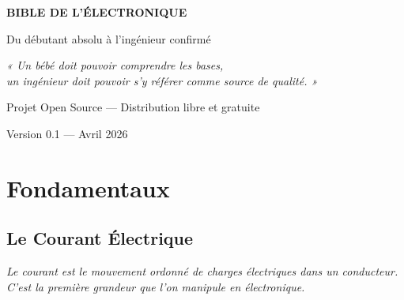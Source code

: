 \documentclass[12pt,a4paper,twoside]{book}
\begin{document}
\begin{titlepage}
\centering
\vspace*{2cm}

{\Huge\bfseries\color{blue!70!black} BIBLE DE L'ÉLECTRONIQUE}

\vspace{0.5cm}
{\Large\color{gray} Du débutant absolu à l'ingénieur confirmé}

\vspace{2cm}


\vspace{2cm}

{\large\itshape « Un bébé doit pouvoir comprendre les bases,\\
un ingénieur doit pouvoir s'y référer comme source de qualité. »}

\vspace{1.5cm}

{\large Projet Open Source — Distribution libre et gratuite}

\vfill
{\small Version 0.1 — Avril 2026}
\end{titlepage}

\tableofcontents
\newpage

\part{Fondamentaux}

\chapter{Le Courant Électrique}

\begin{center}
\textit{Le courant est le mouvement ordonné de charges électriques dans un conducteur.\\
C'est la première grandeur que l'on manipule en électronique.}
\end{center}
\end{document}
